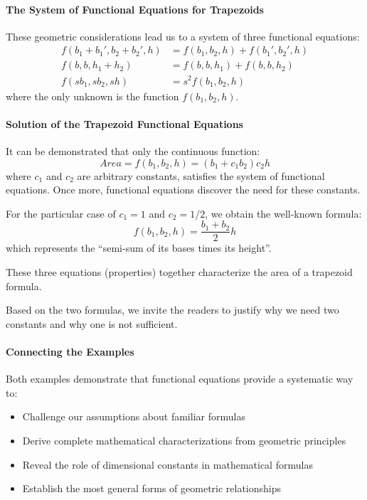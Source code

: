 \paragraph{The System of Functional Equations for Trapezoids}
These geometric considerations lead us to a system of three functional equations:
\begin{align}
f(b_1 + b_1', b_2 + b_2', h) &= f(b_1, b_2, h) + f(b_1', b_2', h) \\
f(b, b, h_1 + h_2) &= f(b, b, h_1) + f(b, b, h_2) \\
f(sb_1, sb_2, sh) &= s^2 f(b_1, b_2, h)
\end{align}
where the only unknown is the function $f(b_1, b_2, h)$.

\paragraph{Solution of the Trapezoid Functional Equations}
It can be demonstrated that only the continuous function:
\begin{equation}
\boxed{Area = f(b_1, b_2, h) = (b_1 + c_1 b_2) c_2 h}
\end{equation}
where $c_1$ and $c_2$ are arbitrary constants, satisfies the system of functional equations. Once more, functional equations discover the need for these constants.

For the particular case of $c_1 = 1$ and $c_2 = 1/2$, we obtain the well-known formula:
\begin{equation}
f(b_1, b_2, h) = \frac{b_1 + b_2}{2}h
\end{equation}
which represents the ``semi-sum of its bases times its height''.

These three equations (properties) together characterize the area of a trapezoid formula.

Based on the two formulas, we invite the readers to justify why we need two constants and why one is not sufficient.

\paragraph{Connecting the Examples}
Both examples demonstrate that functional equations provide a systematic way to:
\begin{itemize}
\item Challenge our assumptions about familiar formulas
\item Derive complete mathematical characterizations from geometric principles
\item Reveal the role of dimensional constants in mathematical formulas
\item Establish the most general forms of geometric relationships
\end{itemize}

